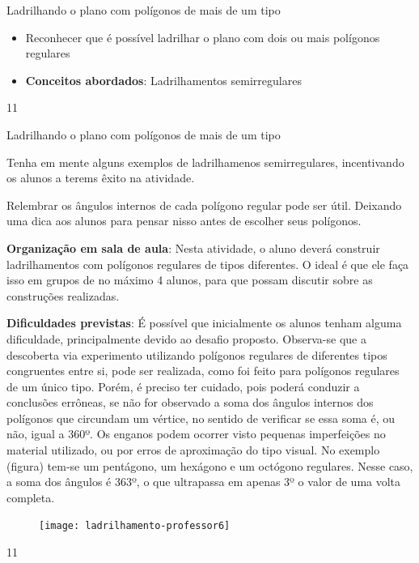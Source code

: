 
\cleardoublepage
\def\currentcolor{session1}
\begin{objectives}{Ladrilhando o plano com polígonos de mais de um tipo}
{
	\begin{itemize}
	\item Reconhecer que é possível ladrilhar o plano com dois ou mais polígonos regulares
	\item \textbf{Conceitos abordados}: Ladrilhamentos semirregulares
	\end{itemize}
}{1}{1}
\end{objectives}
\marginpar{\vspace{-\baselineskip}}
\begin{sugestions}{Ladrilhando o plano com polígonos de mais de um tipo}
{
Tenha  em mente alguns exemplos de ladrilhamenos semirregulares, incentivando os alunos a terems êxito na  atividade.

Relembrar os ângulos internos de cada polígono regular pode ser útil. Deixando uma dica aos alunos para pensar nisso antes de escolher seus polígonos.

\textbf{Organização em sala de aula}: Nesta atividade, o aluno deverá construir ladrilhamentos com polígonos regulares de tipos diferentes. O ideal é que ele faça isso em grupos de no máximo 4 alunos, para que possam discutir sobre as construções realizadas. 

\textbf{Dificuldades previstas}: É possível que inicialmente os alunos tenham alguma dificuldade, principalmente devido ao desafio proposto. Observa-se que a descoberta via experimento utilizando polígonos regulares de diferentes tipos congruentes entre si, pode ser realizada, como foi feito para polígonos regulares de um único tipo. Porém, é preciso ter cuidado, pois poderá conduzir a conclusões errôneas, se não for observado a soma dos ângulos internos dos polígonos que circundam um vértice, no sentido de verificar se essa soma é, ou não, igual a 360º. Os enganos podem ocorrer visto pequenas imperfeições no material utilizado, ou por erros de aproximação do tipo visual. No exemplo (figura) tem-se um pentágono, um hexágono e um octógono regulares. Nesse caso, a soma dos ângulos é 363º, o que ultrapassa em apenas 3º o valor de uma volta completa.

\begin{figure}[H]
\centering

\texttt{[image: ladrilhamento-professor6]}
\end{figure}

}{1}{1}
\end{sugestions}
